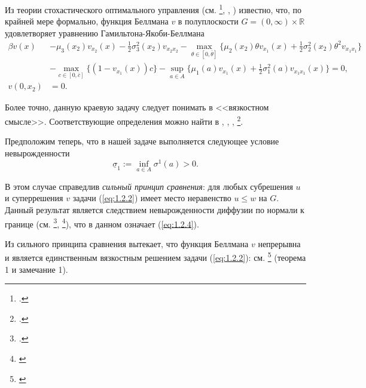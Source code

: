 \documentclass[twoside,12pt]{article}
\begin{document}
Из теории стохастического оптимального управления (см. \footcite{Kry77}, , ) известно, что, по крайней мере формально, функция Беллмана $v$ в полуплоскости $G=(0,\infty)\times \mathbb R$ удовлетворяет уравнению Гамильтона-Якоби-Беллмана
\begin{align} \label{eq:1.2.2}
 \beta v(x) &-\mu_3(x_2) v_{x_2}(x)-\frac{1}{2}\sigma_3^2(x_2) v_{x_2 x_2}-\max_{\theta\in [0,\overline\theta]}\{\mu_2(x_2)\theta v_{x_1}(x)+\frac{1}{2}\sigma_2^2(x_2)\theta^2 v_{x_1 x_1}\}\nonumber\\
&- \max_{c\in [0,\overline c]}\{(1-v_{x_1}(x))c\}-\sup_{a\in A}\{\mu_1(a)v_{x_1}(x)+\frac{1}{2}\sigma_1^2(a)v_{x_1 x_1}(x)\}=0,\\
v(0,x_2) &=0.\nonumber
\end{align}

Более точно, данную краевую задачу следует понимать в <<вязкостном смысле>>. Соответствующие определения можно найти в , , , \footcite{Jak10}.

Предположим теперь, что в нашей задаче выполняется следующее условие невырожденности
\begin{equation} \label{eq:1.2.4}
\underline{\sigma}_1:=\inf_{a\in A}\sigma^1(a)>0.
\end{equation}

В этом случае справедлив \emph{сильный принцип сравнения}: для любых субрешения $u$ и суперрешения $v$ задачи (\ref{eq:1.2.2}) имеет место неравенство $u\le w$ на $G$. Данный результат является следствием невырожденности диффузии по нормали к границе (см. \footcite{BarBur95}, \footnote{\label{BarRou} \cite{BarRou98}}), что в данном означает (\ref{eq:1.2.4}).

Из сильного принципа сравнения вытекает, что функция Беллмана $v$ непрерывна и является единственным вязкостным решением задачи (\ref{eq:1.2.2}): см. \footnote{\label{Rok} \cite{Rok14}} (теорема 1 и замечание 1).
\end{document}
